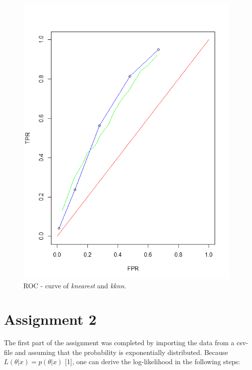 \documentclass[a4paper, twocolumn]{article}
\begin{document}
\begin{figure}[H]
\centering
\begin{minipage}[]{0.5\textwidth}
  \includegraphics[width=\textwidth]{share/Lab1_A1_ROC.png}  
  \caption{ROC - curve of  \textit{knearest} and  \textit{kknn}.\label{fig:roc} }
 \end{minipage}
\end{figure}

    \section*{Assignment 2}

	The first part of the assignment was completed by importing the data from a csv-file and assuming that the probability is exponentially distributed. Because \(L(\theta | x) = p(\theta|x)\)  [1], one can derive the log-likelihood in the following steps:\newline
	
\end{document}
